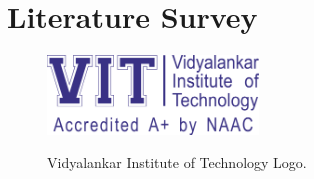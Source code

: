 \chapter{Literature Survey}

\begin{figure}
    \begin{center}
        \includegraphics[width=0.50\textwidth]{./vit-logo.png}\\[0.5cm]
        \caption{Vidyalankar Institute of Technology Logo.\label{fig:logo}}
    \end{center}
\end{figure}

\blindtext